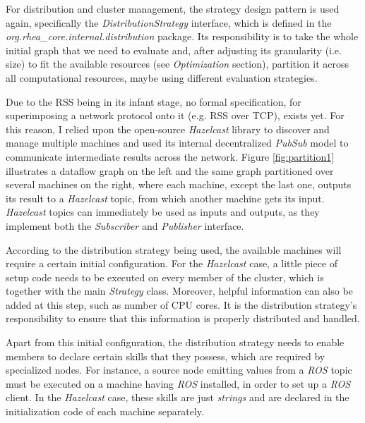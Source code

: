 \documentclass{dithesis}
\begin{document}
For distribution and cluster management, the strategy design pattern is used again, specifically the \textit{DistributionStrategy} interface, which is defined in the \textit{org.rhea\_core.internal.distribution} package. Its responsibility is to take the whole initial graph that we need to evaluate and, after adjusting its granularity (i.e. size) to fit the available resources (see \textit{Optimization} section), partition it across all computational resources, maybe using different evaluation strategies.


Due to the RSS being in its infant stage, no formal specification, for superimposing a network protocol onto it (e.g. RSS over TCP), exists yet. For this reason, I relied upon the open-source \textit{Hazelcast} library\cite{hazelcast} to discover and manage multiple machines and used its internal decentralized \textit{PubSub} model to communicate intermediate results across the network. Figure \ref{fig:partition1} illustrates a dataflow graph on the left and the same graph partitioned over several machines on the right, where each machine, except the last one, outputs its result to a \textit{Hazelcast} topic, from which another machine gets its input. \textit{Hazelcast} topics can immediately be used as inputs and outputs, as they implement both the \textit{Subscriber} and \textit{Publisher} interface.



According to the distribution strategy being used, the available machines will require a certain initial configuration. For the \textit{Hazelcast} case, a little piece of setup code needs to be executed on every member of the cluster, which is together with the main \textit{Strategy} class. Moreover, helpful information can also be added at this step, such as number of CPU cores. It is the distribution strategy's responsibility to ensure that this information is properly distributed and handled.

Apart from this initial configuration, the distribution strategy needs to enable members to declare certain skills that they possess, which are required by specialized nodes. For instance, a source node emitting values from a \textit{ROS} topic must be executed on a machine having \textit{ROS} installed, in order to set up a \textit{ROS} client. In the \textit{Hazelcast} case, these skills are just \textit{strings} and are declared in the initialization code of each machine separately.
\end{document}
